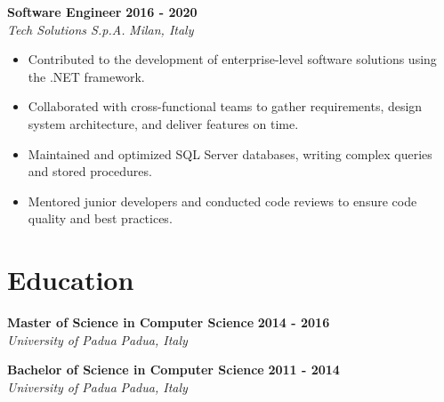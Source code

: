 \documentclass[10pt,a4paper]{article}
\begin{document}
\textbf{Software Engineer} \hfill \textbf{2016 - 2020} \\
\textit{Tech Solutions S.p.A.} \hfill \textit{Milan, Italy}
\begin{itemize}
    \item Contributed to the development of enterprise-level software solutions using the .NET framework.
    \item Collaborated with cross-functional teams to gather requirements, design system architecture, and deliver features on time.
    \item Maintained and optimized SQL Server databases, writing complex queries and stored procedures.
    \item Mentored junior developers and conducted code reviews to ensure code quality and best practices.
\end{itemize}

\section*{Education}
\textbf{Master of Science in Computer Science} \hfill \textbf{2014 - 2016} \\
\textit{University of Padua} \hfill \textit{Padua, Italy}

\textbf{Bachelor of Science in Computer Science} \hfill \textbf{2011 - 2014} \\
\textit{University of Padua} \hfill \textit{Padua, Italy}
\end{document}
